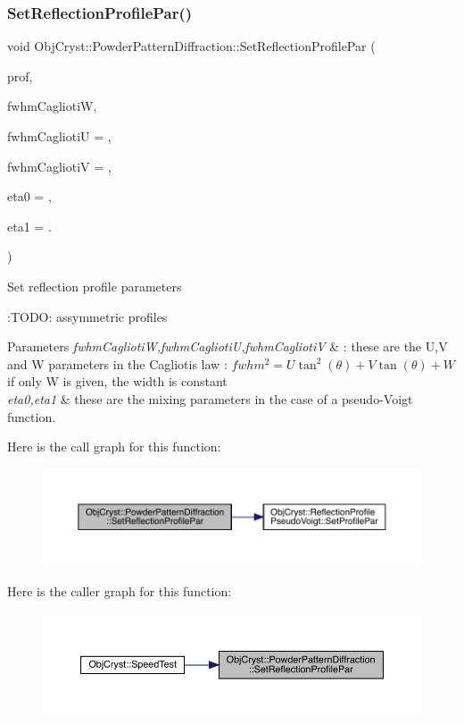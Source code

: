 \subsubsection{\texorpdfstring{SetReflectionProfilePar()}{SetReflectionProfilePar()}}
{\footnotesize\ttfamily void Obj\+Cryst\+::\+Powder\+Pattern\+Diffraction\+::\+Set\+Reflection\+Profile\+Par (\begin{DoxyParamCaption}\item[{const \mbox{\hyperlink{namespace_obj_cryst_a0997f99fe92ed00498e2ed57d51b8aad}{Reflection\+Profile\+Type}}}]{prof,  }\item[{const R\+E\+AL}]{fwhm\+CagliotiW,  }\item[{const R\+E\+AL}]{fwhm\+CagliotiU = {},  }\item[{const R\+E\+AL}]{fwhm\+CagliotiV = {},  }\item[{const R\+E\+AL}]{eta0 = {},  }\item[{const R\+E\+AL}]{eta1 = {.} }\end{DoxyParamCaption})}

Set reflection profile parameters

\+:T\+O\+DO\+: assymmetric profiles 
\begin{DoxyParams}{Parameters}
{\em fwhm\+CagliotiW,fwhm\+CagliotiU,fwhm\+CagliotiV} & \+: these are the U,V and W parameters in the Caglioti\textquotesingle{}s law \+: $ fwhm^2= U \tan^2(\theta) + V \tan(\theta) +W $ if only W is given, the width is constant \\
\hline
{\em eta0,eta1} & these are the mixing parameters in the case of a pseudo-\/\+Voigt function. \\
\hline
\end{DoxyParams}
Here is the call graph for this function\+:
\nopagebreak
\begin{figure}[H]
\begin{center}
\leavevmode
\includegraphics[width=350pt]{class_obj_cryst_1_1_powder_pattern_diffraction_a7e75337a21cc715aefb78ed70d30dba7_cgraph}
\end{center}
\end{figure}
Here is the caller graph for this function\+:
\nopagebreak
\begin{figure}[H]
\begin{center}
\leavevmode
\includegraphics[width=350pt]{class_obj_cryst_1_1_powder_pattern_diffraction_a7e75337a21cc715aefb78ed70d30dba7_icgraph}
\end{center}
\end{figure}


